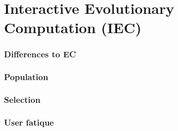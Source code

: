 \chapter{Interactive Evolutionary Computation (IEC)}
\blindtext
\subsection{Differences to EC}
\blindtext
\subsection{Population}
\blindtext
\subsection{Selection}
\blindtext
\subsection{User fatique}
\blindtext
